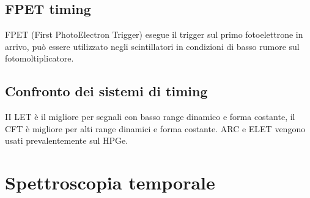 \subsection{FPET timing}
FPET (First PhotoElectron Trigger) esegue il trigger sul primo fotoelettrone in arrivo, pu\`o essere utilizzato negli scintillatori in condizioni di basso rumore sul fotomoltiplicatore.
\subsection{Confronto dei sistemi di timing}
II LET \`e il migliore per segnali con basso range dinamico e forma costante, il CFT \`e migliore per alti range dinamici e forma costante.
ARC e ELET vengono usati prevalentemente sul HPGe.
\section{Spettroscopia temporale}
